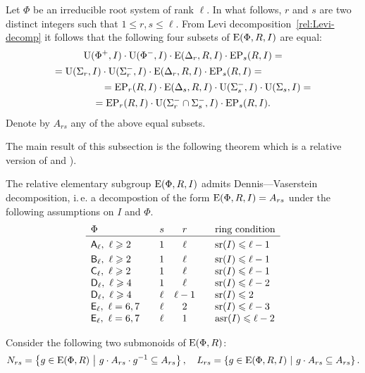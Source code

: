 Let $\Phi$ be an irreducible root system of rank $\ell$.
In what follows, $r$ and $s$ are two distinct integers such that $1 \leq r, s \leq \ell$.
From Levi decomposition~\eqref{rel:Levi-decomp} it follows that the following four subsets of $\operatorname{E}(\Phi, R, I)$ are equal:
\begin{multline*}
\operatorname{U}(\Phi^+, I)\cdot \operatorname{U}(\Phi^-, I) \cdot \operatorname{E}(\Delta_r, R, I) \cdot \operatorname{EP}_s(R, I) = \\
= \operatorname{U}(\Sigma_r, I)\cdot \operatorname{U}(\Sigma^-_r, I) \cdot \operatorname{E}(\Delta_r, R, I) \cdot \operatorname{EP}_s(R, I) = \hspace{5em} \\
\hspace{5em} = \operatorname{EP}_r(R, I) \cdot \operatorname{E}(\Delta_s, R, I) \cdot \operatorname{U}(\Sigma_s^-, I)\cdot \operatorname{U}(\Sigma_s, I) = \\
= \operatorname{EP}_r(R, I) \cdot \operatorname{U}(\Sigma^-_r \cap \Sigma^-_s, I) \cdot \operatorname{EP}_s(R, I).
\end{multline*}
Denote by $A_{rs}$ any of the above equal subsets.

The main result of this subsection is the following theorem which is a relative version of \cite[Lemma~2.1]{ST76} and \cite[Theorem~2.5]{St78}).
\begin{thm}\label{thm:DennisVaserstein}
The relative elementary subgroup $\operatorname{E}(\Phi, R, I)$ admits Dennis---Vaserstein decomposition, i.\,e. a decompostion of the form $\operatorname{E}(\Phi, R, I) = A_{rs}$ under the following assumptions on $I$ and $\Phi$.
\[\begin{array}{l@{\qquad}c@{\quad}c@{\qquad}l}
\Phi                                 & s    & r      & \text{ring condition} \\ \hline\vphantom{\Bigl(}
\rA_\ell,\ \ell\geqslant 2            & 1    & \ell   & \sr(I) \leqslant \ell-1 \\    
\rB_\ell,\ \ell\geqslant 2            & 1    & \ell   & \sr(I) \leqslant \ell-1 \\
\rC_\ell,\ \ell \geqslant 2          & 1    & \ell   & \sr(I) \leqslant \ell-1 \\
\rD_\ell,\ \ell\geqslant 4           & 1    & \ell   & \sr(I) \leqslant \ell-2 \\ 
\rD_\ell,\ \ell\geqslant 4           & \ell & \ell-1 & \sr(I) \leqslant 2      \\
\rE_\ell,\ \ell=6,7                  & \ell & 2      & \sr(I) \leqslant \ell-3 \\ 
\rE_\ell,\ \ell=6,7                  & \ell & 1      & \asr(I)\leqslant \ell-2 \end{array}\]
\end{thm}
Consider the following two submonoids of $\operatorname{E}(\Phi, R)$:
\[ N_{rs} = \left\{ g\in \operatorname{E}(\Phi, R)\ \middle|\ g \cdot A_{rs} \cdot g^{-1} \subseteq A_{rs} \right\}, \quad
   L_{rs}=  \left\{ g\in \operatorname{E}(\Phi, R, I)\ \middle|\ g \cdot A_{rs} \subseteq A_{rs} \right\}. \]

